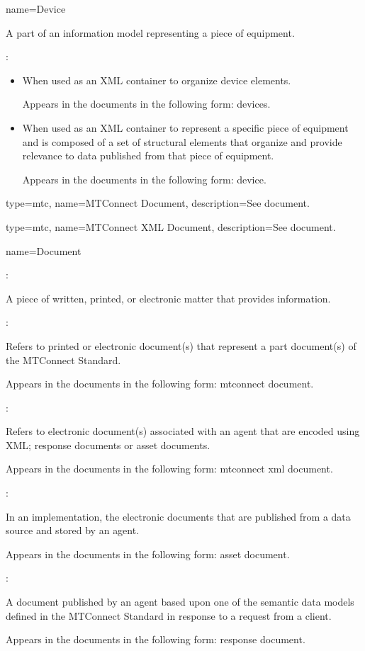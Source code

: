 {
  name={Device}
}
{
	A part of an information model representing a piece of equipment.  
	
	:

    \begin{itemize}
	\item When used as an XML container to organize \gls{device} elements.

	Appears in the documents in the following form: \gls{devices}.

	\item When used as an XML container to represent a specific piece of equipment and is composed of a set of \glspl{structural element} that organize and provide relevance to data published from that piece of equipment.

	Appears in the documents in the following form: \gls{device}.
	\end{itemize}
}


{
  type=mtc,
  name={MTConnect Document},
  description={See \gls{document}.}
}

{
  type=mtc,
  name={MTConnect XML Document},
  description={See \gls{document}.}
}


{
  name={Document}
}
{
	:

	A piece of written, printed, or electronic matter that provides information.

	:

	Refers to printed or electronic document(s) that represent a \gls{part document}(s) of the MTConnect Standard.

	Appears in the documents in the following form: \gls{mtconnect document}.

	:

	Refers to electronic document(s) associated with an \gls{agent} that are encoded using XML; \glspl{response document} or \glspl{asset document}.

	Appears in the documents in the following form: \gls{mtconnect xml document}.

	:

	In an implementation, the electronic documents that are published from a data source and stored by an \gls{agent}.

	Appears in the documents in the following form: \gls{asset document}.

	:

	A document published by an \gls{agent} based upon one of the \glspl{semantic data model} defined in the MTConnect Standard in response to a request from a client.  

	Appears in the documents in the following form: \gls{response document}.
}


